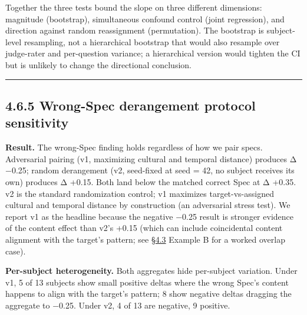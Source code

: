 Together the three tests bound the slope on three different dimensions:
magnitude (bootstrap), simultaneous confound control (joint regression),
and direction against random reassignment (permutation). The bootstrap
is subject-level resampling, not a hierarchical bootstrap that would
also resample over judge-rater and per-question variance; a hierarchical
version would tighten the CI but is unlikely to change the directional
conclusion.

\begin{center}\rule{0.5\linewidth}{0.5pt}\end{center}

\hypertarget{wrong-spec-derangement-protocol-sensitivity}{%
\subsection{4.6.5 Wrong-Spec derangement protocol
sensitivity}\label{wrong-spec-derangement-protocol-sensitivity}}

\textbf{Result.} The wrong-Spec finding holds regardless of how we pair
specs. Adversarial pairing (v1, maximizing cultural and temporal
distance) produces Δ −0.25; random derangement (v2, seed-fixed at seed =
42, no subject receives its own) produces Δ +0.15. Both land below the
matched correct Spec at Δ +0.35. v2 is the standard randomization
control; v1 maximizes target-vs-assigned cultural and temporal distance
by construction (an adversarial stress test). We report v1 as the
headline because the negative −0.25 result is stronger evidence of the
content effect than v2's +0.15 (which can include coincidental content
alignment with the target's pattern; see \hyperref[mechanism-correct-content-not-format]{§4.3} Example B for a worked
overlap case).

\textbf{Per-subject heterogeneity.} Both aggregates hide per-subject
variation. Under v1, 5 of 13 subjects show small positive deltas where
the wrong Spec's content happens to align with the target's pattern; 8
show negative deltas dragging the aggregate to −0.25. Under v2, 4 of 13
are negative, 9 positive.

